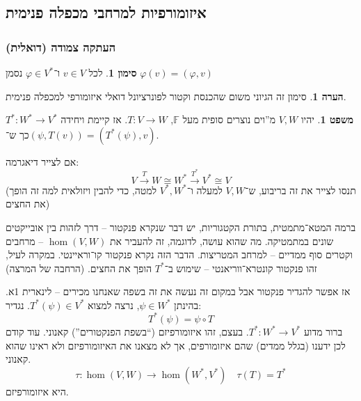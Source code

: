 \documentclass[a4paper]{article}
\newcommand\F         {\mathbb{F}}
\newcommand\co        {\colon}
\renewcommand\phi     {\varphi}
\theoremstyle{definition}
\newtheorem{Theorem}{\color{myblue}משפט}
\newtheorem{Remark}{\color{mycyan}הערה}
\newtheorem{Notion}{\color{myred}סימון}
\newcommand\theo  [1] {\begin{Theorem}#1\end{Theorem}}
\newcommand\rmark [1] {\begin{Remark}#1\end{Remark}}
\newcommand\noti  [1] {\begin{Notion}#1\end{Notion}}
\begin{document}
	\subsection{איזומורפיות למרחבי מכפלה פנימית}
	\subsubsection{העתקה צמודה (דואלית)}
	\noti{לכל $v \in V$ ו־$\phi \in V^*$ נסמן $\phi(v) = (\phi, v)$}
	\rmark{סימון זה הגיוני משום שהכנסת וקטור לפונרציונל דואלי איזומורפי למכפלה פנימית. }
	\theo{יהיו $V, W$ מ''וים נוצרים סופית מעל $\F$, $T \co V \to W$. אז קיימת ויחידה $T^* \co W^* \to V^*$ כך ש־$(\psi, T(v)) = (T^*(\psi), v)$. }
	אם לצייר דיאגרמה: 
	\[ V \overset{T}{\to} W \cong W^* \overset{T^*}{\to} V^* \cong V \]
	(תנסו לצייר את זה בריבוע, ש־$V, W$ למעלה ו־$V^*, W^*$ למטה, כדי להבין ויזולאית למה זה הופך את החצים)
	
	ברמה המטא־מתמטית, בתורת הקטגוריות, יש דבר שנקרא פנקטור – דרך לזהות בין אובייקטים שונים במתמטיקה. מה שהוא עושה, לדוגמה, זה להעביר את $\hom(V, W)$ – מרחבים וקטרים סוף ממדיים – למרחב המטריצות. הדבר הזה נקרא פנקטור קו־וראיינטי. במקרה לעיל, זהו פנקטור קונטרא־ווריאנטי – שימוש ב־$T^*$ הופך את החצים. (הרחבה של המרצה)
	
	אז אפשר להגדיר פנקטור אבל במקום זה נעשה את זה בשפה שאנחנו מכירים – לינארית 1א. בהינתן $\psi \in W^*$, נרצה למצוא $T^*(\psi) \in V^*$. נגדיר: 
	\[ T^*(\psi) = \psi \circ T \]
	ברור מדוע $T^* \co W^* \to V^*$. בעצם, זהו איזומורפיזם (``בשפת הפנקטורים'') קאנוני. עוד קודם לכן ידענו (בגלל ממדים) שהם איזומורפים, אך לא מצאנו את האיזומורפיזם ולא ראינו שהוא קאנוני. 
	\[ \tau \co \hom(V, W) \to \hom(W^*, V^*) \quad \tau(T) = T^*  \]
	היא איזומורפיזם. 
	
\end{document}
